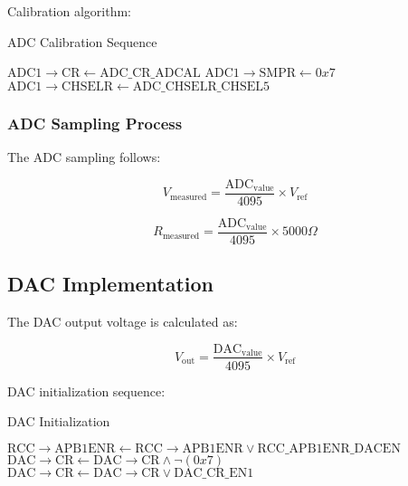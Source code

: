 \documentclass{article}
\begin{document}
Calibration algorithm:

\begin{algorithm}[H]
\caption{ADC Calibration Sequence}
\begin{algorithmic}[1]
\State $\text{ADC1}\rightarrow\text{CR} \gets \text{ADC\_CR\_ADCAL}$
    \State {}
\EndWhile
\State $\text{ADC1}\rightarrow\text{SMPR} \gets 0x7$ 
\State $\text{ADC1}\rightarrow\text{CHSELR} \gets \text{ADC\_CHSELR\_CHSEL5}$
\end{algorithmic}
\end{algorithm}

\subsubsection{ADC Sampling Process}

The ADC sampling follows:

\begin{equation}
V_{\text{measured}} = \frac{\text{ADC}_{\text{value}}}{4095} \times V_{\text{ref}}
\end{equation}

\begin{equation}
R_{\text{measured}} = \frac{\text{ADC}_{\text{value}}}{4095} \times 5000\Omega
\end{equation}

\subsection{DAC Implementation}

The DAC output voltage is calculated as:

\begin{equation}
V_{\text{out}} = \frac{\text{DAC}_{\text{value}}}{4095} \times V_{\text{ref}}
\end{equation}

DAC initialization sequence:

\begin{algorithm}[H]
\caption{DAC Initialization}
\begin{algorithmic}[1]
\State $\text{RCC}\rightarrow\text{APB1ENR} \gets \text{RCC}\rightarrow\text{APB1ENR} \lor \text{RCC\_APB1ENR\_DACEN}$
\State $\text{DAC}\rightarrow\text{CR} \gets \text{DAC}\rightarrow\text{CR} \land \neg(0x7)$
\State $\text{DAC}\rightarrow\text{CR} \gets \text{DAC}\rightarrow\text{CR} \lor \text{DAC\_CR\_EN1}$
\end{algorithmic}
\end{algorithm}
\end{document}
